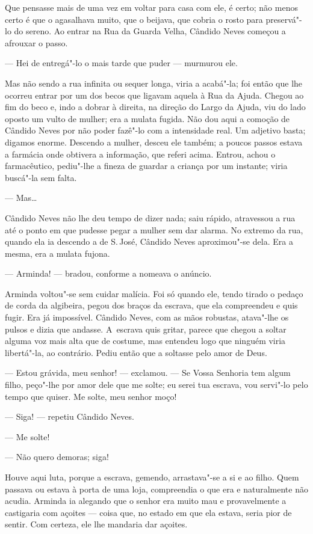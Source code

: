 \begin{linenumbers}
Que pensasse mais de uma vez em voltar para casa com ele, é certo; não
menos certo é que o agasalhava muito, que o beijava, que cobria o rosto
para preservá"-lo do sereno. Ao entrar na Rua da Guarda Velha, Cândido
Neves começou a afrouxar o passo.

--- Hei de entregá"-lo o mais tarde que puder --- murmurou ele.

Mas não sendo a rua infinita ou sequer longa, viria a acabá"-la; foi
então que lhe ocorreu entrar por um dos becos que ligavam aquela à Rua
da Ajuda. Chegou ao fim do beco e, indo a dobrar à direita, na direção
do Largo da Ajuda, viu do lado oposto um vulto de mulher; era a mulata
fugida. Não dou aqui a comoção de Cândido Neves por não poder fazê"-lo
com a intensidade real. Um adjetivo basta; digamos enorme. Descendo a
mulher, desceu ele também; a poucos passos estava a farmácia onde
obtivera a informação, que referi acima. Entrou, achou o farmacêutico,
pediu"-lhe a fineza de guardar a criança por um instante; viria buscá"-la
sem falta.

--- Mas\ldots{}

Cândido Neves não lhe deu tempo de dizer nada; saiu rápido, atravessou a
rua até o ponto em que pudesse pegar a mulher sem dar alarma. No extremo
da rua, quando ela ia descendo a de S.\,José, Cândido Neves aproximou"-se
dela. Era a mesma, era a mulata fujona.

--- Arminda! --- bradou, conforme a nomeava o anúncio.

Arminda voltou"-se sem cuidar malícia. Foi só quando ele, tendo tirado o
pedaço de corda da algibeira, pegou dos braços da escrava, que ela
compreendeu e quis fugir. Era já impossível. Cândido Neves, com as mãos
robustas, atava"-lhe os pulsos e dizia que andasse. A~escrava quis
gritar, parece que chegou a soltar alguma voz mais alta que de costume,
mas entendeu logo que ninguém viria libertá"-la, ao contrário. Pediu
então que a soltasse pelo amor de Deus.

--- Estou grávida, meu senhor! --- exclamou. --- Se Vossa Senhoria tem
algum filho, peço"-lhe por amor dele que me solte; eu serei tua escrava,
vou servi"-lo pelo tempo que quiser. Me solte, meu senhor moço!

--- Siga! --- repetiu Cândido Neves.

--- Me solte!

--- Não quero demoras; siga!

Houve aqui luta, porque a escrava, gemendo, arrastava"-se a si e ao
filho. Quem passava ou estava à porta de uma loja, compreendia o que era
e naturalmente não acudia. Arminda ia alegando que o senhor era muito
mau e provavelmente a castigaria com açoites --- coisa que, no estado em
que ela estava, seria pior de sentir. Com certeza, ele lhe mandaria dar
açoites.


\end{linenumbers}
